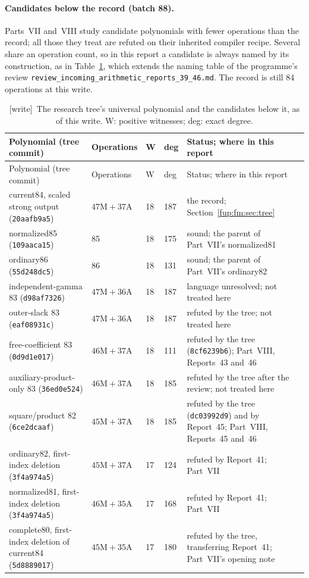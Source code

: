 \documentclass[11pt,letterpaper]{article}
\theoremstyle{definition}\newtheorem{definition}[theorem]{Definition}
\theoremstyle{remark}\newtheorem{remark}[theorem]{Remark}
\newcommand{\wtag}{\textup{[write]}}
\newcommand{\rw}[1]{\nolinkurl{#1}}%
\begin{document}
\paragraph{Candidates below the record (batch 88).} Parts~VII and~VIII study candidate polynomials with fewer operations than the record; all those they treat are refuted on their inherited compiler recipe. Several share an operation count, so in this report a candidate is always named by its construction, as in Table~\ref{fup:fm:tab:candidates}, which extends the naming table of the programme's review \rw{review_incoming_arithmetic_reports_39_46.md}. The record is still 84 operations at this write.
{\small
\begin{longtable}{@{}>{\raggedright\arraybackslash}p{}p{}p{}p{}>{\raggedright\arraybackslash}p{}@{}}
\caption{\wtag\ The research tree's universal polynomial and the candidates below it, as of this write. W: positive witnesses; deg: exact degree.}\label{fup:fm:tab:candidates}\\
\toprule
Polynomial (tree commit) & Operations & W & deg & Status; where in this report\\\midrule\endfirsthead
\toprule
Polynomial (tree commit) & Operations & W & deg & Status; where in this report\\\midrule\endhead
current84, scaled strong output (\texttt{20aafb9a5}) & $47\mathrm M+37\mathrm A$ & 18 & 187 & the record; Section~\ref{fup:fm:sec:tree}\\
normalized85 (\texttt{109aaca15}) & 85 & 18 & 175 & sound; the parent of Part~VII's normalized81\\
ordinary86 (\texttt{55d248dc5}) & 86 & 18 & 131 & sound; the parent of Part~VII's ordinary82\\
independent-gamma 83 (\texttt{d98af7326}) & $47\mathrm M+36\mathrm A$ & 18 & 187 & language unresolved; not treated here\\
outer-slack 83 (\texttt{eaf08931c}) & $47\mathrm M+36\mathrm A$ & 18 & 187 & refuted by the tree; not treated here\\
free-coefficient 83 (\texttt{0d9d1e017}) & $46\mathrm M+37\mathrm A$ & 18 & 111 & refuted by the tree (\texttt{8cf6239b6}); Part~VIII, Reports~43 and~46\\
auxiliary-product-only 83 (\texttt{36ed0e524}) & $46\mathrm M+37\mathrm A$ & 18 & 185 & refuted by the tree after the review; not treated here\\
square/product 82 (\texttt{6ce2dcaaf}) & $45\mathrm M+37\mathrm A$ & 18 & 185 & refuted by the tree (\texttt{dc03992d9}) and by Report~45; Part~VIII, Reports~45 and~46\\
ordinary82, first-index deletion (\texttt{3f4a974a5}) & $45\mathrm M+37\mathrm A$ & 17 & 124 & refuted by Report~41; Part~VII\\
normalized81, first-index deletion (\texttt{3f4a974a5}) & $46\mathrm M+35\mathrm A$ & 17 & 168 & refuted by Report~41; Part~VII\\
complete80, first-index deletion of current84 (\texttt{5d8889017}) & $45\mathrm M+35\mathrm A$ & 17 & 180 & refuted by the tree, transferring Report~41; Part~VII's opening note\\\bottomrule
\end{longtable}
}
\end{document}
